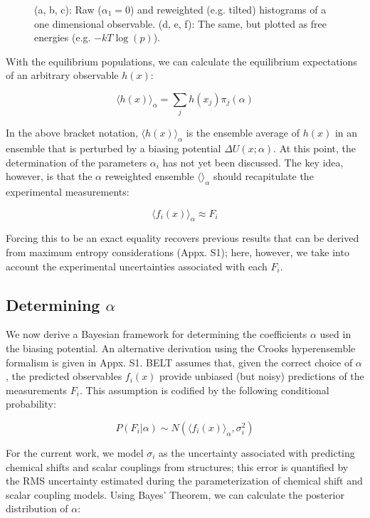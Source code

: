 \documentclass[journal=jacsat,manuscript=article]{achemso}
\begin{document}
\begin{figure}
\caption{
(a, b, c): Raw ($\alpha_1 = 0$) and reweighted (e.g. tilted) histograms of a one dimensional observable.  (d, e, f): The same, but plotted as free energies (e.g. $-kT \log(p)$).  
}
\label{figure:Hist}
\end{figure}

With the equilibrium populations, we can calculate the equilibrium expectations of an arbitrary observable $h(x)$:

$$\langle h(x)\rangle _\alpha = \sum_j h(x_j) \pi_j(\alpha)$$

In the above bracket notation, $\langle h(x)\rangle _\alpha$ is the ensemble average of $h(x)$ in an ensemble that is perturbed by a biasing potential $\Delta U(x;\alpha)$.  At this point, the determination of the parameters $\alpha_i$ has not yet been discussed.  The key idea, however, is that the $\alpha$ reweighted ensemble $\langle \rangle _\alpha$ should recapitulate the experimental measurements:

$$\langle f_i(x)\rangle _\alpha \approx F_i$$

Forcing this to be an exact equality recovers previous results \cite{chodera2012} that can be derived from maximum entropy considerations (Appx. S1); here, however, we take into account the experimental uncertainties associated with each $F_i$.  

\subsection*{Determining $\alpha$}

We now derive a Bayesian framework for determining the coefficients $\alpha$ used in the biasing potential.  An alternative derivation using the Crooks hyperensemble formalism \cite{crooks2007beyond} is given in Appx. S1.  BELT assumes that, given the correct choice of $\alpha$, the predicted observables $f_i(x)$ provide unbiased (but noisy) predictions of the measurements $F_i$.  This assumption is codified by the following conditional probability:

$$P(F_i | \alpha) \sim N(\langle f_i(x)\rangle _\alpha, \sigma_i^2)$$

For the current work, we model $\sigma_i$ as the uncertainty associated with predicting chemical shifts and scalar couplings from structures; this error is quantified by the RMS uncertainty estimated during the parameterization of chemical shift and scalar coupling models.  Using Bayes' Theorem, we can calculate the posterior distribution of $\alpha$:
\end{document}
